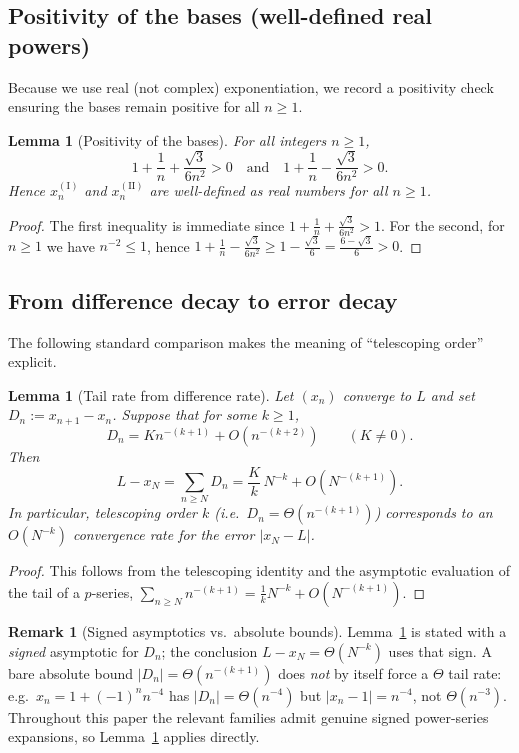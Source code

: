 \documentclass[11pt]{article}
\newtheorem{lemma}[theorem]{Lemma}
\theoremstyle{definition}
\newtheorem{remark}[theorem]{Remark}
\begin{document}
\subsection{Positivity of the bases (well-defined real powers)}
Because we use real (not complex) exponentiation, we record a positivity check
ensuring the bases remain positive for all $n\ge1$.

\begin{lemma}[Positivity of the bases]\label{lem:pos}
For all integers $n\ge1$,
\[
  1+\frac1n+\frac{\sqrt3}{6n^2} > 0
  \quad\text{and}\quad
  1+\frac1n-\frac{\sqrt3}{6n^2} > 0 .
\]
Hence $x_n^{(\mathrm{I})}$ and $x_n^{(\mathrm{II})}$ are well-defined as real
numbers for all $n\ge1$.
\end{lemma}

\begin{proof}
The first inequality is immediate since $1+\tfrac1n+\tfrac{\sqrt3}{6n^2}>1$.
For the second, for $n\ge1$ we have $n^{-2}\le1$, hence
$1+\tfrac1n-\tfrac{\sqrt3}{6n^2}\ge 1-\tfrac{\sqrt3}{6}=\tfrac{6-\sqrt3}{6}>0$.
\end{proof}

\subsection{From difference decay to error decay}
The following standard comparison makes the meaning of ``telescoping order''
explicit.

\begin{lemma}[Tail rate from difference rate]\label{lem:tail}
Let $(x_n)$ converge to $L$ and set $D_n := x_{n+1}-x_n$. Suppose that for some
$k\ge1$,
\[
  D_n = K n^{-(k+1)} + O(n^{-(k+2)}) \qquad (K\neq0).
\]
Then
\[
  L - x_N = \sum_{n\ge N} D_n = \frac{K}{k}\,N^{-k} + O(N^{-(k+1)}).
\]
In particular, telescoping order $k$ (i.e.\ $D_n=\Theta(n^{-(k+1)})$) corresponds
to an $O(N^{-k})$ convergence rate for the error $|x_N-L|$.
\end{lemma}

\begin{proof}
This follows from the telescoping identity and the asymptotic evaluation of the
tail of a $p$-series,
$\sum_{n\ge N} n^{-(k+1)} = \tfrac1k N^{-k} + O(N^{-(k+1)})$.
\end{proof}

\begin{remark}[Signed asymptotics vs.\ absolute bounds]\label{rem:theta}
Lemma~\ref{lem:tail} is stated with a \emph{signed} asymptotic for $D_n$; the
conclusion $L-x_N=\Theta(N^{-k})$ uses that sign. A bare absolute bound
$|D_n|=\Theta(n^{-(k+1)})$ does \emph{not} by itself force a $\Theta$ tail rate:
e.g.\ $x_n = 1+(-1)^n n^{-4}$ has $|D_n|=\Theta(n^{-4})$ but $|x_n-1|=n^{-4}$,
not $\Theta(n^{-3})$. Throughout this paper the relevant families admit genuine
signed power-series expansions, so Lemma~\ref{lem:tail} applies directly.
\end{remark}
\end{document}
